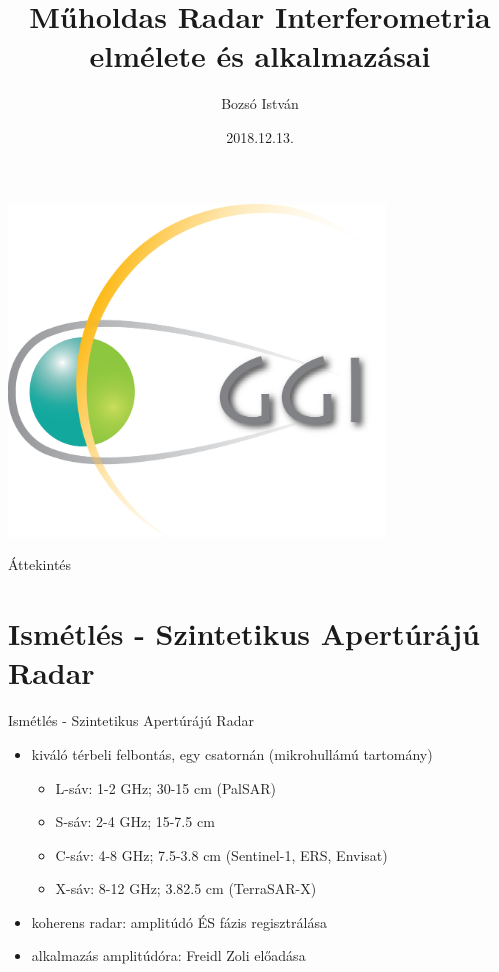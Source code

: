 \documentclass[aspectratio=169]{beamer}
\title[Műholdas Távérzékelés Labor, 2018/19.I.]{Műholdas Radar Interferometria elmélete és alkalmazásai}
\author[Bozsó István]{Bozsó István}
\institute[MTA CSFK GGI]{MTA CSFK Geodéziai és Geofizikai Intézet}
\date{2018.12.13.}
\begin{document}
\begin{frame}
    \titlepage
    \begin{center}
        \begin{minipage}[c]{0.3\textwidth}
            \includegraphics[width=0.75\textwidth]{ggi_logo.png}
        \end{minipage}
    \end{center}
\end{frame}

\begin{frame}{Áttekintés}
    \tableofcontents
\end{frame}

\def\ft{Ismétlés - Szintetikus Apertúrájú Radar}
\section{\ft}


\begin{frame}{\ft}
    \begin{itemize}
        \item kiváló térbeli felbontás, egy csatornán (mikrohullámú tartomány)
        \begin{itemize}
            \item L-sáv: 1-2 GHz; 30-15 cm (PalSAR)
            \item S-sáv: 2-4 GHz; 15-7.5 cm
            \item C-sáv: 4-8 GHz; 7.5-3.8 cm (Sentinel-1, ERS, Envisat)
            \item X-sáv: 8-12 GHz; 3.82.5 cm (TerraSAR-X)
        \end{itemize}
        \item koherens radar: amplitúdó ÉS fázis regisztrálása
        \item alkalmazás amplitúdóra: Freidl Zoli előadása
    \end{itemize}
\end{frame}
\end{document}
